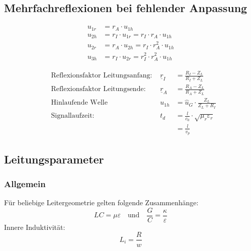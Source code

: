 \subsection{Mehrfachreflexionen bei fehlender Anpassung}

\begin{align*}
	u_{1r} & = r_A\cdot u_{1h}                                \\
	u_{2h} & = r_I\cdot u_{1r} = r_I\cdot r_A\cdot u_{1h}     \\
	u_{2r} & = r_A\cdot u_{2h} = r_I\cdot r_A^2\cdot u_{1h}   \\
	u_{3h} & = r_I\cdot u_{2r} = r_I^2\cdot r_A^2\cdot u_{1h}
\end{align*}

\begin{align*}
	 & \text{Reflexionsfaktor Leitungsanfang: } & \underline{r}_I & = \frac{R_I - Z_L}{R_I + Z_L}                 \\
	 & \text{Reflexionsfaktor Leitungsende: }   & \underline{r}_A & = \frac{R_A - Z_L}{R_A + Z_L}                 \\
	 & \text{Hinlaufende Welle}                 & u_{1h}          & = \hat{u}_G \cdot\frac{Z_L}{Z_L+R_I}          \\
	 & \text{Signallaufzeit: }                  & t_d             & = \frac{l}{c_0}\cdot\sqrt{\mu_r\varepsilon_r} \\
	 &                                          &                 & = \frac{l}{v_p}
\end{align*}

\subsection{Leitungsparameter}
\subsubsection{Allgemein}
Für beliebige Leitergeometrie gelten folgende Zusammenhänge:
\[
	\boxed{LC = \mu\varepsilon} \quad \text{und} \quad \boxed{\frac{G}{C} = \frac{\kappa}{\varepsilon}}
\]
Innere Induktivität:
\[
	L_i = \frac{R}{w}
\]

\textbf{\color{red}{Leitungen gehen HIN und ZURÜCK!!!}\\
	\color{red}{Länge verdoppeln!!!}
}

